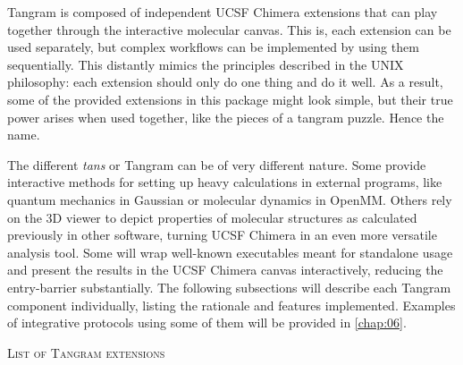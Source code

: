 Tangram is composed of independent UCSF Chimera extensions that can play together through the interactive molecular canvas. This is, each extension can be used separately, but complex workflows can be implemented by using them sequentially. This distantly mimics the principles described in the UNIX philosophy: each extension should only do one thing and do it well.\cite{raymond2003art} As a result, some of the provided extensions in this package might look simple, but their true power arises when used together, like the pieces of a tangram puzzle. Hence the name.

The different \textit{tans} or Tangram can be of very different nature. Some provide interactive methods for setting up heavy calculations in external programs, like quantum mechanics in Gaussian or molecular dynamics in OpenMM. Others rely on the 3D viewer to depict properties of molecular structures as calculated previously in other software, turning UCSF Chimera in an even more versatile analysis tool. Some will wrap well-known executables meant for standalone usage and present the results in the UCSF Chimera canvas interactively, reducing the entry-barrier substantially. The following subsections will describe each Tangram component individually, listing the rationale and features implemented. Examples of integrative protocols using some of them will be provided in \autoref{chap:06}.

\textsc{List of Tangram extensions}

